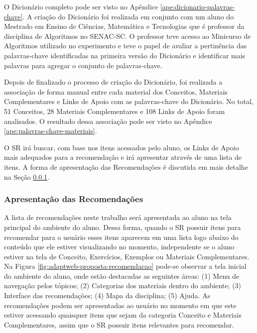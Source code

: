 O Dicionário completo pode ser visto no Apêndice \ref{ape:dicionario-palavras-chave}. A criação do Dicionário foi realizada
em conjunto com um aluno do Mestrado em Ensino de Ciências, Matemática e Tecnologias que é professor da disciplina de
Algoritmos no SENAC-SC. O professor teve acesso ao Minicurso de Algoritmos utilizado no experimento
e teve o papel de avaliar a pertinência das palavras-chave identificadas na primeira versão do Dicionário e identificar
mais palavras para agregar o conjunto de palavras-chave.

Depois de finalizado o processo de criação do Dicionário, foi realizada a associação de forma manual entre cada material dos Conceitos,
Materiais Complementares e Links de Apoio com as palavras-chave do Dicionário. No total, 51 Conceitos, 28 Materiais
Complementares e 108 Links de Apoio foram analisados. O resultado dessa associação pode ser visto no Apêndice \ref{ape:palavras-chave-materiais}.

O SR irá buscar, com base nos itens acessados pelo aluno, os Links de Apoio mais adequados
para a recomendação e irá apresentar através de uma lista de itens. A forma de apresentação das Recomendações é discutida
em mais detalhe na Seção \ref{subsection:apresentacao-recomendacoes}.

\subsubsection{Apresentação das Recomendações}\label{subsection:apresentacao-recomendacoes}

A lista de recomendações neste trabalho será apresentada ao aluno na tela principal do ambiente do aluno. Dessa forma,
quando o SR possuir itens para recomendar para o usuário esses itens aparecem em uma lista logo abaixo do conteúdo que
ele estiver visualizando no momento, independente se o aluno estiver na tela de Conceito, Exercícios, Exemplos ou
Materiais Complementares. Na Figura \ref{fig:adaptweb-proposta-recomendacao} pode-se observar a tela inicial do ambiente do
aluno, onde estão destacadas as seguintes áreas: (1) Menu de navegação pelos tópicos; (2) Categorias dos materiais dentro
do ambiente; (3) Interface das recomendações; (4) Mapa da disciplina; (5) Ajuda. As recomendações podem ser apresentadas ao usuário no momento em que este estiver acessando
quaisquer itens que sejam da categoria Conceito e Materiais Complementares, assim que o SR possuir itens relevantes para recomendar.

